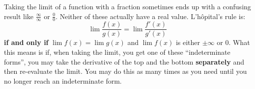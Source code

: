 \documentclass[../revisedmain.tex]{subfiles}
\begin{document}
	Taking the limit of a function with a fraction sometimes ends up with a confusing result like $\displaystyle\frac{\infty}{\infty}$ or $\displaystyle\frac{0}{0}$. Neither of these actually have a real value. L'h\^opital's rule is:$$\lim\frac{f(x)}{g(x)}=\lim\frac{f'(x)}{g'(x)}$$ \textbf{if and only if} $\lim f(x)= \lim g(x)$ and $\lim f(x)$ is either $\pm\infty$ or 0. What this means is if, when taking the limit, you get one of these ``indeterminate forms'', you may take the derivative of the top and the bottom \textbf{separately} and then re-evaluate the limit. You may do this as many times as you need until you no longer reach an indeterminate form.
\end{document}

